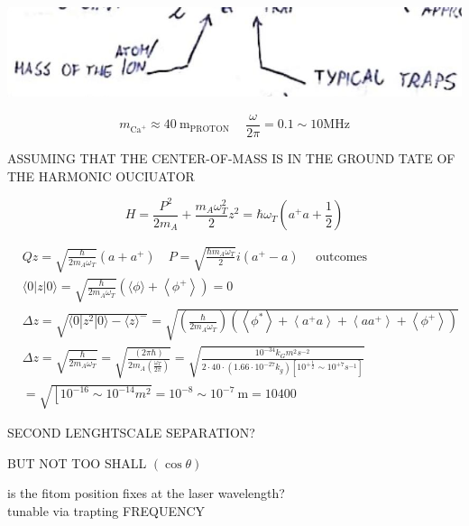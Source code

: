 \documentclass[10pt]{article}
\begin{document}
\begin{center}
\includegraphics[max width=\textwidth]{2025_10_16_9146de9f5ba4f09535e7g-2(1)}
\end{center}

$$
m_{\mathrm{Ca}^{+}} \approx 40 \mathrm{~m}_{\text {PROTON }} \quad \frac{\omega}{2 \pi}=0.1 \sim 10 \mathrm{MHz}
$$

ASSUMING THAT THE CENTER-OF-MASS IS IN THE GROUND TATE OF THE HARMONIC OUCIUATOR

$$
H=\frac{P^{2}}{2 m_{A}}+\frac{m_{A} \omega_{T}^{2}}{2} z^{2}=\hbar \omega_{T}\left(a^{+} a+\frac{1}{2}\right)
$$

$$
\begin{aligned}
& Q z=\sqrt{\frac{\hbar}{2 m_{A} \omega_{T}}}\left(a+a^{+}\right) \quad P=\sqrt{\frac{\hbar m_{A} \omega_{T}}{2}} i\left(a^{+}-a\right) \quad \text { outcomes } \\
&\langle 0| z|0\rangle=\sqrt{\frac{\hbar}{2 m_{A} \omega_{T}}}\left(\langle\phi\rangle+\left\langle\phi^{+}\right\rangle\right)=0 \\
& \Delta z=\sqrt{\langle 0| z^{2}|0\rangle-\langle z\rangle^{-}}=\sqrt{\left(\frac{\hbar}{2 m_{A} \omega_{T}}\right)\left(\left\langle\phi^{*}\right\rangle+\left\langle a^{+} a\right\rangle+\left\langle a a^{+}\right\rangle+\left\langle\phi^{+}\right\rangle\right)} \\
& \Delta z=\sqrt{\frac{\hbar}{2 m_{A} \omega_{T}}}=\sqrt{\frac{(2 \pi \hbar)}{2 m_{A}\left(\frac{\omega_{T}}{2 \pi}\right)}}=\sqrt{\frac{10^{-34} k_{G} m^{2} s^{-2}}{2 \cdot 40 \cdot\left(1.66 \cdot 10^{-27} k_{g}\right)\left[10^{+\frac{1}{2}} \sim 10^{+7} s^{-1}\right]}} \\
&=\sqrt{\left[10^{-16} \sim 10^{-14} m^{2}\right.}=10^{-8} \sim 10^{-7} \mathrm{~m}=10400
\end{aligned}
$$

SECOND LENGHTSCALE SEPARATION?

\begin{displayquote}
BUT NOT TOO SHALL $(\cos \theta)$
\end{displayquote}

is the fitom position fixes at the laser wavelength?\\
tunable via trapting FREQUENCY
\end{document}
